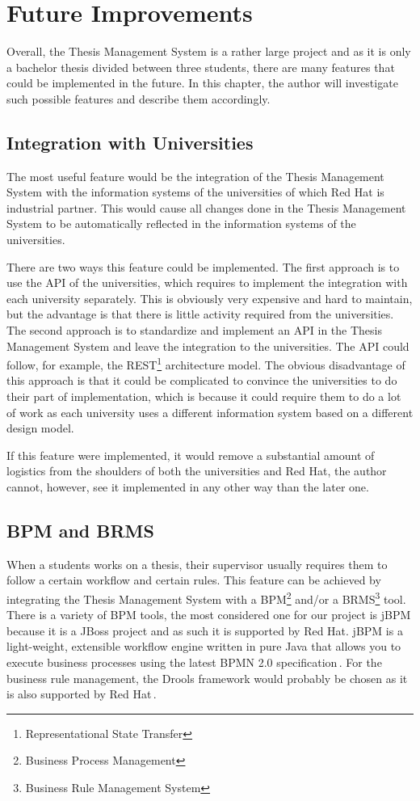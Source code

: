 \chapter{Future Improvements}

Overall, the Thesis Management System is a rather large project and as it is only a bachelor thesis divided between three students, there are many features that could be implemented in the future. In this chapter, the author will investigate such possible features and describe them accordingly.

\section{Integration with Universities}

The most useful feature would be the integration of the Thesis Management System with the information systems of the universities of which Red Hat is industrial partner. This would cause all changes done in the Thesis Management System to be automatically reflected in the information systems of the universities. 

There are two ways this feature could be implemented. The first approach is to use the API of the universities, which requires to implement the integration with each university separately. This is obviously very expensive and hard to maintain, but the advantage is that there is little activity required from the universities. The second approach is to standardize and implement an API in the Thesis Management System and leave the integration to the universities. The API could follow, for example, the REST\footnote{Representational State Transfer} architecture model. The obvious disadvantage of this approach is that it could be complicated to convince the universities to do their part of implementation, which is because it could require them to do a lot of work as each university uses a different information system based on a different design model. 

If this feature were implemented, it would remove a substantial amount of logistics from the shoulders of both the universities and Red Hat, the author cannot, however, see it implemented in any other way than the later one.

\section{BPM and BRMS}

When a students works on a thesis, their supervisor usually requires them to follow a certain workflow and certain rules. This feature can be achieved by integrating the Thesis Management System with a BPM\footnote{Business Process Management} and/or a BRMS\footnote{Business Rule Management System} tool. There is a variety of BPM tools, the most considered one for our project is jBPM because it is a JBoss project and as such it is supported by Red Hat. jBPM is a light-weight, extensible workflow engine written in pure Java that allows you to execute business processes using the latest BPMN 2.0 specification\,\cite{jbpm-homepage}. For the business rule management, the Drools framework would probably be chosen as it is also supported by Red Hat\,\cite{drools-homepage}. 

